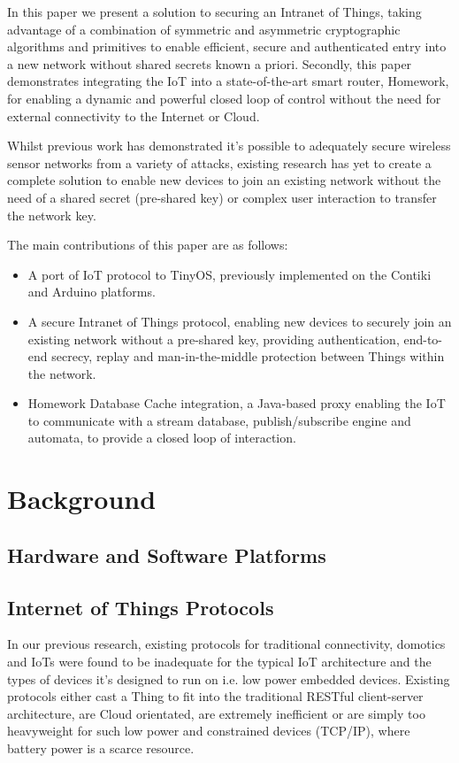 \documentclass[conference]{./sty/IEEEtran}
\begin{document}
In this paper we present a solution to securing an Intranet of Things, taking advantage of a combination of symmetric and asymmetric cryptographic algorithms and primitives to enable efficient, secure and authenticated entry into a new network without shared secrets known a priori. Secondly, this paper demonstrates integrating the IoT into a state-of-the-art smart router, Homework\cite{HomeworkProject}, for enabling a dynamic and powerful closed loop of control without the need for external connectivity to the Internet or Cloud. 

Whilst previous work has demonstrated it's possible to adequately secure wireless sensor networks from a variety of attacks\cite{TinySec,TinyECC,MiniSec}, existing research has yet to create a complete solution to enable new devices to join an existing network without the need of a shared secret (pre-shared key)\cite{TinySec,MiniSec} or complex user interaction to transfer the network key\cite{MessageBottle}.

The main contributions of this paper are as follows:
\begin{itemize}
  \item A port of IoT protocol to TinyOS, previously implemented on the Contiki and Arduino platforms.
  \item A secure Intranet of Things protocol, enabling new devices to securely join an existing network without a pre-shared key, providing authentication, end-to-end secrecy, replay and man-in-the-middle protection between Things within the network. 
  \item Homework Database Cache integration, a Java-based proxy enabling the IoT to communicate with a stream database, publish/subscribe engine and automata, to provide a closed loop of interaction.
\end{itemize}

\section{Background} %
\label{sec:background}

\subsection{Hardware and Software Platforms} %
\label{sec:hardware_and_software_platforms}

\subsection{Internet of Things Protocols} %
\label{sub:internet_of_things_protocols}
In our previous research\cite{KNoT}, existing protocols for traditional connectivity, domotics and IoTs were found to be inadequate for the typical IoT architecture and the types of devices it's designed to run on i.e. low power embedded devices. Existing protocols either cast a Thing to fit into the traditional RESTful client-server architecture\cite{IETF_COAP_HTTP}, are Cloud orientated\cite{SmartThings,Twine}, are extremely inefficient\cite{xAP} or are simply too heavyweight for such low power and constrained devices (TCP/IP), where battery power is a scarce resource. 
\end{document}
